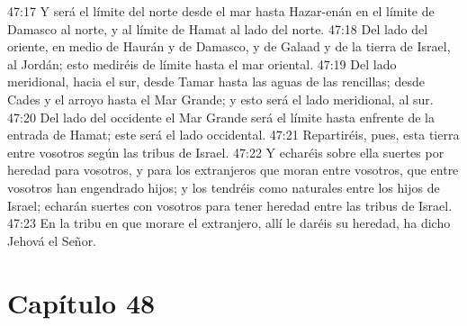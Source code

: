 47:17 Y será el límite del norte desde el mar hasta Hazar-enán en el límite de Damasco al norte, y al límite de Hamat al lado del norte.   
47:18 Del lado del oriente, en medio de Haurán y de Damasco, y de Galaad y de la tierra de Israel, al Jordán; esto mediréis de límite hasta el mar oriental.   
47:19 Del lado meridional, hacia el sur, desde Tamar hasta las aguas de las rencillas; desde Cades y el arroyo hasta el Mar Grande; y esto será el lado meridional, al sur.   
47:20 Del lado del occidente el Mar Grande será el límite hasta enfrente de la entrada de Hamat; este será el lado occidental.   
47:21 Repartiréis, pues, esta tierra entre vosotros según las tribus de Israel.   
47:22 Y echaréis sobre ella suertes por heredad para vosotros, y para los extranjeros que moran entre vosotros, que entre vosotros han engendrado hijos; y los tendréis como naturales entre los hijos de Israel; echarán suertes con vosotros para tener heredad entre las tribus de Israel.   
47:23 En la tribu en que morare el extranjero, allí le daréis su heredad, ha dicho Jehová el Señor.   
\section*{Capítulo 48  }
  

